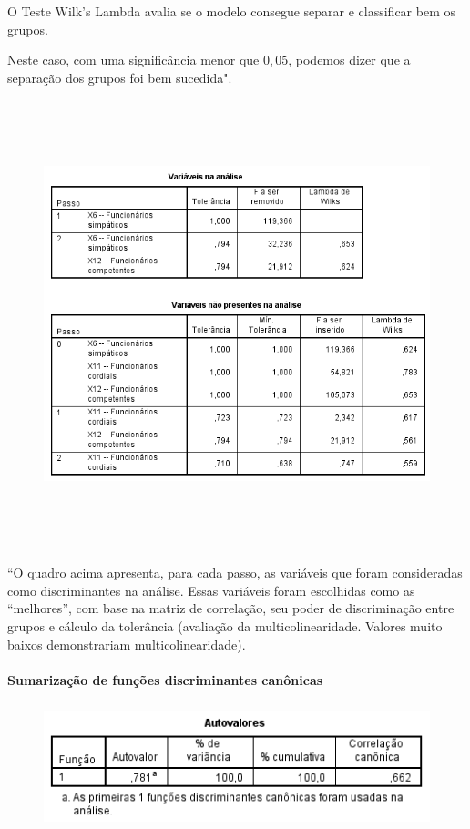 				O Teste Wilk’s Lambda avalia se o modelo consegue separar e classificar bem os grupos.

				Neste caso, com uma significância menor que $0,05$, podemos dizer que a separação dos grupos foi bem sucedida".

				\begin{figure}[H]
					\centering
					\includegraphics[height=13cm]{images/analise-discriminante_stepwise_var-presentes-e-n-presentes}
				\end{figure}

				``O quadro acima apresenta, para cada passo, as variáveis que foram consideradas como discriminantes na análise. Essas variáveis foram escolhidas como as “melhores”, com base na matriz de correlação, seu poder de discriminação entre grupos e cálculo da tolerância (avaliação da multicolinearidade. Valores muito baixos demonstrariam multicolinearidade).

			\paragraph{Sumarização de funções discriminantes canônicas} \hspace{0cm}

				\begin{figure}[H]
					\centering
					\includegraphics[height=3.5cm]{images/analise-discriminante_sumarizacao_autovalores}
				\end{figure}

